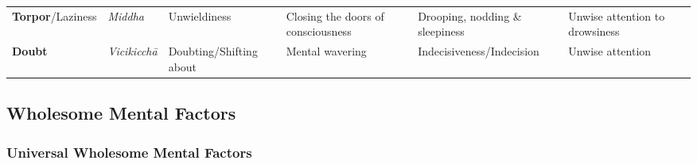 \documentclass[a4 paper, 12pt]{article}
\begin{document}
\begin{tabular}{P{0.21\textwidth} | C{.13\textwidth} C{.165\textwidth} C{0.165\textwidth} C{0.165\textwidth} C{0.165\textwidth} m{0mm}}
\textbf{Torpor}/\newline Laziness & \textit{Middha} & Unwieldiness & Closing the doors of consciousness & Drooping, nodding \& sleepiness & Unwise attention to drowsiness &\\[9mm]
\textbf{Doubt} & \textit{Vicikicchā} & Doubting/\newline Shifting about & Mental wavering & Indecisiveness/\newline Indecision & Unwise attention &\\[9mm]
\bottomrule
\end{tabular}

\subsection*{Wholesome Mental Factors}

\subsubsection*{Universal Wholesome Mental Factors}
\end{document}
